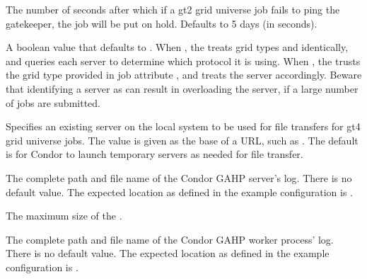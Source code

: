 \begin{description}

\label{param:GlobusGatekeeperTimeout}
\item[\Macro{GLOBUS\_GATEKEEPER\_TIMEOUT}]
  The number of seconds after which if a gt2 grid
  universe job fails to ping the gatekeeper, the job will be put on hold.
  Defaults to 5 days (in seconds).

\label{param:GramVersionDetection}
\item[\Macro{GRAM\_VERSION\_DETECTION}]
  A boolean value that defaults to .
  When , the  treats grid types
   and  identically, and queries each server to
  determine which protocol it is using.
  When , the  trusts the grid type
  provided in job attribute , and treats the server
  accordingly.
  Beware that identifying a  server as  can result in
  overloading the server, if a large number of jobs are submitted.

\label{param:GridftpUrlBase} 
\item[\Macro{GRIDFTP\_URL\_BASE}]
  Specifies an existing  server on the local system to be used for
  file transfers for gt4 grid universe jobs. The value is given as the base
  of a URL, such as . The default is for
  Condor to launch temporary  servers as needed for file transfer.

\label{param:CGAHPLog}
\item[\Macro{C\_GAHP\_LOG}]
  The complete path and file name of the Condor GAHP server's log.
  There is no default value. The expected location as defined
  in the example configuration is .

\label{param:MaxCGAHPLog}
\item[\Macro{MAX\_C\_GAHP\_LOG}]
  The maximum size of the .

\label{param:CGAHPWorkerThreadLog}
\item[\Macro{C\_GAHP\_WORKER\_THREAD\_LOG}]
  The complete path and file name of the Condor GAHP worker process' log.
  There is no default value.
  The expected location as defined in the example configuration is
  .


\end{description}
